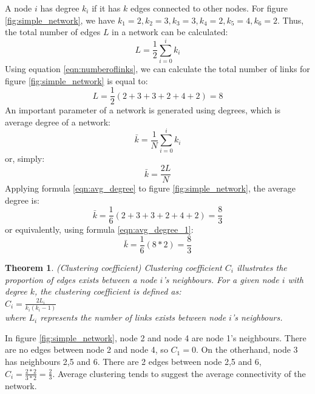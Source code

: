 \documentclass[12pt]{article}
\newtheorem{theorem}{Theorem}[section]
\begin{document}
\par
A node $i$ has degree $k_i$ if it has $k$ edges connected to other nodes. For figure \ref{fig:simple_network}, we have $k_1=2,k_2=3,k_3=3,k_4=2,k_5=4,k_6=2$. Thus, the total number of edges $L$ in a network can be calculated:
\begin{equation}
    L = \frac{1}{2}\sum^{i}_{i=0}{k_i}
    \label{eqn:numberoflinks}
\end{equation}
Using equation \ref{eqn:numberoflinks}, we can calculate the total number of links for figure \ref{fig:simple_network} is equal to:\\
\begin{equation}
    L =\frac{1}{2}(2+3+3+2+4+2)=8
\end{equation}
An important parameter of a network is generated using degrees, which is average degree of a network:
\begin{equation}
    \bar{k}=\frac{1}{N} \sum^{i}_{i=0}{k_i}
    \label{eqn:avg_degree}
\end{equation}
or, simply:
\begin{equation}
    \bar{k}=\frac{2L}{N}
    \label{eqn:avg_degree_1}
\end{equation}
Applying formula \ref{eqn:avg_degree} to figure \ref{fig:simple_network}, the average degree is:
\begin{equation}
    \bar{k} = \frac{1}{6}(2+3+3+2+4+2)=\frac{8}{3}
\end{equation}
or equivalently, using formula \ref{eqn:avg_degree_1}:
\begin{equation}
    \bar{k} = \frac{1}{6}(8*2)=\frac{8}{3}
\end{equation}
\begin{theorem}{(Clustering coefficient)}
    Clustering coefficient $C_i$ illustrates the proportion of edges exists between a node $i$'s neighbours. For a given node $i$ with degree $k$, the clustering coefficient is defined as:\\
    $C_i=\frac{2L_i}{k_i(k_i-1)}$\\
    where $L_i$ represents the number of links exists between node $i$'s neighbours.
\end{theorem}
\par 
In figure \ref{fig:simple_network}, node 2 and node 4 are node 1's neighbours. There are no edges between node 2 and node 4, so $C_1 = 0$. On the otherhand, node 3 has neighbours 2,5 and 6. There are 2 edges between node 2,5 and 6, $C_i=\frac{2*2}{3*2}=\frac{2}{3}$. Average clustering tends to suggest the average connectivity of the network.
\end{document}
